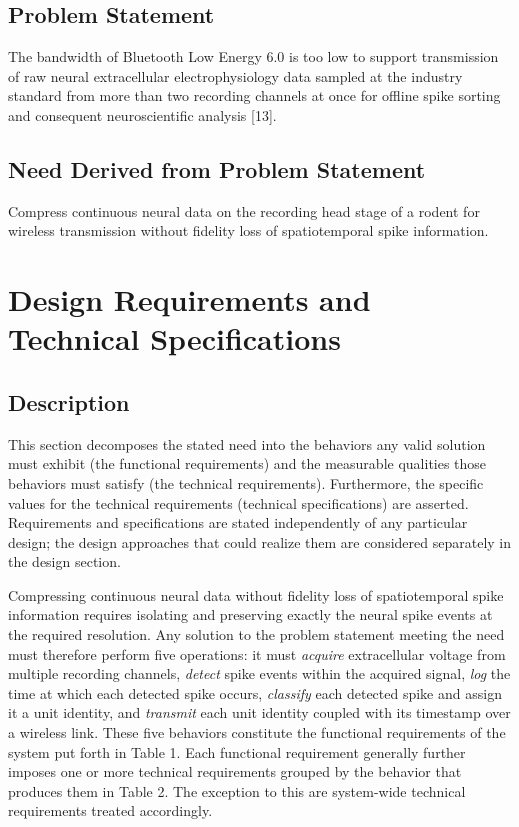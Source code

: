 \documentclass[11pt]{article}
\begin{document}
\subsection*{Problem Statement}
The bandwidth of Bluetooth Low Energy 6.0 is too low to support transmission
of raw neural extracellular electrophysiology data sampled at the industry standard 
from more than two recording channels at once for offline spike sorting and consequent 
neuroscientific analysis [13].

\subsection*{Need Derived from Problem Statement}
Compress continuous neural data on the recording head stage of a rodent 
for wireless transmission without fidelity loss of spatiotemporal spike information.

\section*{Design Requirements and Technical Specifications}
\subsection*{Description}

This section decomposes the stated need into the behaviors any valid solution must
exhibit (the functional requirements) and the measurable qualities those behaviors
must satisfy (the technical requirements). Furthermore, the specific values for the technical 
requirements (technical specifications) are asserted. Requirements and specifications are stated 
independently of any particular design; the design approaches that could realize them are considered
separately in the design section.

Compressing continuous neural data without fidelity loss of spatiotemporal spike information 
requires isolating and preserving exactly the neural spike events at the required resolution. Any
solution to the problem statement meeting the need must therefore perform five operations: 
it must \emph{acquire} extracellular voltage from multiple recording channels, \emph{detect} 
spike events within the acquired signal, \emph{log} the time at which each detected spike occurs,
\emph{classify} each detected spike and assign it a unit identity, and \emph{transmit}
each unit identity coupled with its timestamp over a wireless link. These five
behaviors constitute the functional requirements of the system put forth in Table 1. Each functional 
requirement generally further imposes one or more technical requirements grouped by the behavior that produces them in Table 2.
The exception to this are system-wide technical requirements treated accordingly.
\end{document}
